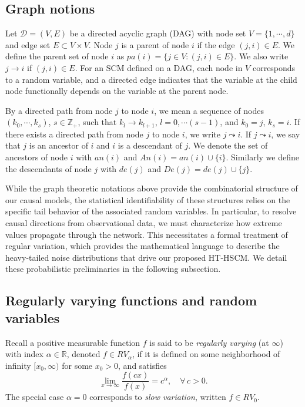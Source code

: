 \documentclass[10pt]{article}
\begin{document}
 

\subsection{Graph  notions}
Let $\mathcal{D}=(V,E)$ be a directed acyclic graph (DAG) with node set $V=\{1, \cdots, d\}$ and edge set $E \subset V \times V$. 
Node $j$ is a parent of node $i$ if the edge $(j,i) \in E$. We define the parent set of node $i$ as $pa(i)=\{j \in V: (j,i) \in E \}$.
We also write $j \to i$ if  $(j,i)\in E$. 
For an SCM defined on a DAG, each node in \(V\) corresponds to a random variable, and a directed edge indicates that the variable at the child node functionally depends on the variable at the parent node.

By a directed path from node $j$ to node $i$,  we mean a sequence of nodes $ (k_0 ,\cdots, k_s)$, $s\in \mathbb{Z}_+$,  such that $k_l \to k_{l+1}$, $ l=0,\cdots (s-1)$, and $k_0=j$, $k_s=i$.  If there exists a directed path from node $j$ to node $i$, we write $j \leadsto i$. If $j \leadsto i$, we say that $j$ is an ancestor of   $i$ and $i$ is a descendant of $j$. We denote the set of ancestors of node $i$ with $an(i)$ and $An(i)= an(i) \cup \{i\}$. Similarly we define the descendants of node $j$ with $de(j)$ and $De(j) = de(j) \cup \{j\}$.


 While the graph theoretic notations above provide the combinatorial structure of our causal models, the statistical identifiability of these structures relies on the specific tail behavior of the associated   random variables. In particular, to resolve causal directions from observational data, we must characterize how extreme values propagate through the network. This necessitates a formal treatment of regular variation, which provides the mathematical language to describe the heavy-tailed noise distributions that drive our proposed HT-HSCM. We detail these probabilistic preliminaries in the following subsection.








\subsection{Regularly varying functions and random variables}
Recall a positive measurable function $f$  is said to be \emph{regularly varying} (at $\infty$)  with index 
$\alpha \in \mathbb{R}$, denoted $f \in RV_\alpha$, if it is defined on some neighborhood of 
infinity $[x_0, \infty)$ for some $x_0 > 0$, and satisfies
\[
\lim_{x \to \infty} \frac{f(cx)}{f(x)} = c^{\alpha}, \quad \forall\, c > 0.
\]
The special case $\alpha = 0$ corresponds to \emph{slow variation}, written $f \in RV_0$.
\end{document}
